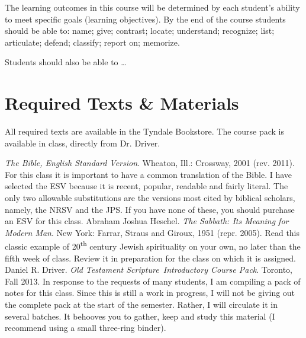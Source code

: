 \documentclass[titlepage]{article}
\newcommand\coursetitle  {Old Testament Scripture}
\newcommand\semester     {Fall 2013}
\begin{document}
The learning outcomes in this course will be determined by each
student's ability to meet specific goals (learning objectives). By the
end of the course students should be able to:
  name;
  give;
  contrast;
  locate;
  understand;
  recognize;
  list;
  articulate;
  defend;
  classify;
  report on;
  memorize.

Students should also be able to \ldots

\section{Required Texts \& Materials}
\label{texts}

All required texts are available in the Tyndale Bookstore. The course
pack is available in class, directly from Dr. Driver.

\begingroup
\renewcommand{\section}[2]{}%
\begin{thebibliography}{Heschel}%
   \emph{The Bible, English Standard Version}.
    Wheaton, Ill.: Crossway, 2001 (rev. 2011). For this class it is
    important to have a common translation of the Bible. I have selected
    the ESV because it is recent, popular, readable and fairly literal.
    The only two allowable substitutions are the versions most cited by
    biblical scholars, namely, the NRSV and the JPS. If you have none of
    these, you should purchase an ESV for this class.
   Abraham Joshua Heschel.
    \emph{The Sabbath: Its Meaning for Modern Man}. New York: Farrar,
    Straus and Giroux, 1951 (repr. 2005). Read this classic example of
    20\textsuperscript{th} century Jewish spirituality on your own, no
    later than the fifth week of class. Review it in preparation for the
    class on which it is assigned.
   Daniel R. Driver.
    \emph{\coursetitle\ Introductory Course Pack}. Toronto, \semester.
    In response to the requests of many students, I am compiling a pack
    of notes for this class. Since this is still a work in progress,
    I will not be giving out the complete pack at the start of the
    semester. Rather, I will circulate it in several batches. It
    behooves you to gather, keep and study this material (I recommend
    using a small three-ring binder).
\end{thebibliography}
\endgroup
\end{document}
